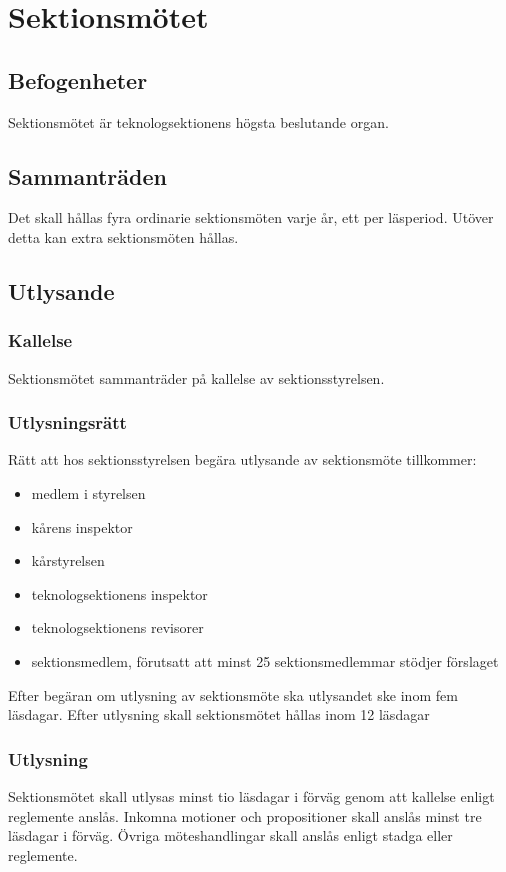 \section{Sektionsmötet}

\subsection{Befogenheter}
Sektionsmötet är teknologsektionens högsta beslutande organ.

\subsection{Sammanträden}
Det skall hållas fyra ordinarie sektionsmöten varje år, ett per läsperiod. Utöver detta kan extra sektionsmöten hållas.

\subsection{Utlysande}
\label{sec:utlysande}

\subsubsection{Kallelse}
Sektionsmötet sammanträder på kallelse av sektionsstyrelsen.

\subsubsection{Utlysningsrätt}
Rätt att hos sektionsstyrelsen begära utlysande av sektionsmöte tillkommer:

\begin{itemize}
	\item medlem i styrelsen
	\item kårens inspektor
	\item kårstyrelsen
	\item teknologsektionens inspektor
	\item teknologsektionens revisorer
	\item sektionsmedlem, förutsatt att minst 25 sektionsmedlemmar stödjer förslaget
\end{itemize}

Efter begäran om utlysning av sektionsmöte ska utlysandet ske inom fem läsdagar. Efter utlysning skall sektionsmötet hållas inom 12 läsdagar

\subsubsection{Utlysning}
Sektionsmötet skall utlysas minst tio läsdagar i förväg genom att kallelse enligt reglemente anslås. Inkomna motioner och propositioner skall anslås minst tre läsdagar i förväg. Övriga möteshandlingar skall anslås enligt stadga eller reglemente. 

